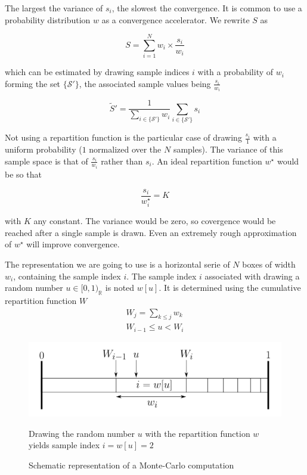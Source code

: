 \documentclass[./thesis.tex]{subfiles}
\begin{document}
The largest the variance of $s_i$, the slowest the convergence. It is common to use a probability distribution $w$ as a convergence accelerator. We rewrite $S$ as 

\begin{equation}
S = \sum_{i=1}^N {w_i \times \frac{s_i}{w_i}}
\end{equation}

which can be estimated by drawing sample indices $i$ with a probability of $w_i$ forming the set $\{\mathcal{S'}\}$, the associated sample values being $\frac{s_i}{w_i}$

\begin{equation}
\tilde S' = \frac{1} {\sum_{i \in \{ \mathcal{S'} \} } w_i} \sum_{i \in \{\mathcal{S'}\}} {s_i}
\end{equation}

Not using a repartition function is the particular case of drawing $\frac{s_i}{1}$ with a uniform probability ($1$ normalized over the $N$ samples). The variance of this sample space is that of $\frac{s_i}{w_i}$ rather than $s_i$. An ideal repartition function $w^\star$ would be so that

\begin{equation}
\frac{s_i}{w^\star_i} = K
\end{equation}

with $K$ any constant. The variance would be zero, so covergence would be reached after a single sample is drawn. Even an extremely rough approximation of $w^\star$ will improve convergence.



The representation we are going to use is a horizontal serie of $N$ boxes of width $w_i$, containing the sample index $i$.
The sample index $i$ associated with drawing a random number $u \in [0,1)_\mathbb{R}$ is noted $w[u]$. It is determined using the cumulative repartition function $W$
\begin{align}
W_j = \sum_{k \leq j} w_k \\
W_{i-1} \leq u < W_i
\end{align}

\begin{figure}[h!]
	\begin{center}
		\includegraphics[width=0.9\columnwidth]{figures/pt2/mc_representation}
		\caption{Schematic representation of a Monte-Carlo computation}
		\label{fig:mc_representation}
		Drawing the random number $u$ with the repartition function $w$ yields sample index $i=w[u] = 2$
	\end{center}
\end{figure}
\end{document}
